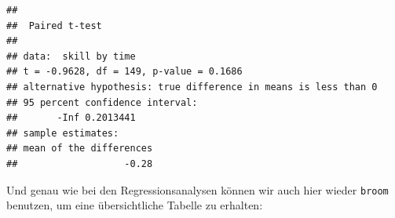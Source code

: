 \documentclass[
]{book}
\newenvironment{Shaded}{\begin{snugshade}}{\end{snugshade}}
\newcommand{\AttributeTok}[1]{\textcolor[rgb]{0.77,0.63,0.00}{#1}}
\newcommand{\ConstantTok}[1]{\textcolor[rgb]{0.00,0.00,0.00}{#1}}
\newcommand{\FunctionTok}[1]{\textcolor[rgb]{0.00,0.00,0.00}{#1}}
\newcommand{\NormalTok}[1]{#1}
\newcommand{\SpecialCharTok}[1]{\textcolor[rgb]{0.00,0.00,0.00}{#1}}
\newcommand{\StringTok}[1]{\textcolor[rgb]{0.31,0.60,0.02}{#1}}
\begin{document}
\begin{verbatim}
## 
##  Paired t-test
## 
## data:  skill by time
## t = -0.9628, df = 149, p-value = 0.1686
## alternative hypothesis: true difference in means is less than 0
## 95 percent confidence interval:
##       -Inf 0.2013441
## sample estimates:
## mean of the differences 
##                   -0.28
\end{verbatim}

Und genau wie bei den Regressionsanalysen können wir auch hier wieder \texttt{broom} benutzen, um eine übersichtliche Tabelle zu erhalten:

\begin{Shaded}
\end{Shaded}

 
  \providecommand{\huxb}[2]{\arrayrulecolor[RGB]{#1}\global\arrayrulewidth=#2pt}
  \providecommand{\huxvb}[2]{\color[RGB]{#1}\vrule width #2pt}
  \providecommand{\huxtpad}[1]{\rule{0pt}{#1}}
  \providecommand{\huxbpad}[1]{\rule[-#1]{0pt}{#1}}
\end{document}
